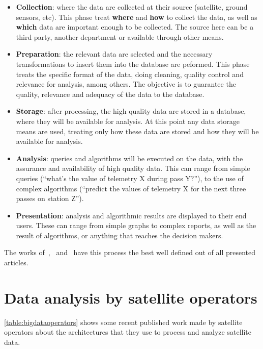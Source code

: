 \begin{itemize}[noitemsep]
  \item \textbf{Collection}: where the data are collected at their source (satellite, ground sensors, etc).
    This phase treat \textbf{where} and \textbf{how} to collect the data, as well as \textbf{which} data are important enough to be collected.
    The source here can be a third party, another department or available through other means.
  \item \textbf{Preparation}: the relevant data are selected and the necessary transformations to insert them into the database are peformed.
    This phase treats the specific format of the data, doing cleaning, quality control and relevance for analysis, among others.
    The objective is to guarantee the quality, relevance and adequacy of the data to the database.
  \item \textbf{Storage}: after processing, the high quality data are stored in a database, where they will be available for analysis.
    At this point any data storage means are used, treating only how these data are stored and how they will be available for analysis.
  \item \textbf{Analysis}: queries and algorithms will be executed on the data, with the assurance and availability of high quality data.
    This can range from simple queries (``what's the value of telemetry X during pass Y?''), to the use of complex algorithms (``predict the values of telemetry X for the next three passes on station Z'').
  \item \textbf{Presentation}: analysis and algorithmic results are displayed to their end users.
    These can range from simple graphs to complex reports, as well as the result of algorithms, or anything that reaches the decision makers.
\end{itemize}

The works of~,~ and~ have this process the best well defined out of all presented articles.

\section{Data analysis by satellite operators}\label{ch:corr:ops}

\autoref{table:bigdataoperators} shows some recent published work made by satellite operators about the architectures that they use to process and analyze satellite data.

